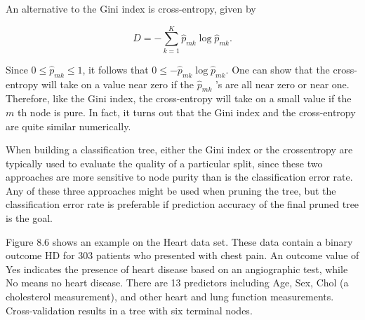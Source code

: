 \documentclass[10pt]{article}
\begin{document}
An alternative to the Gini index is cross-entropy, given by


\begin{equation*}
D=-\sum_{k=1}^{K} \hat{p}_{m k} \log \hat{p}_{m k} . \tag{8.7}
\end{equation*}


Since $0 \leq \hat{p}_{m k} \leq 1$, it follows that $0 \leq-\hat{p}_{m k} \log \hat{p}_{m k}$. One can show that the cross-entropy will take on a value near zero if the $\hat{p}_{m k}$ 's are all near zero or near one. Therefore, like the Gini index, the cross-entropy will take on a small value if the $m$ th node is pure. In fact, it turns out that the Gini index and the cross-entropy are quite similar numerically.

When building a classification tree, either the Gini index or the crossentropy are typically used to evaluate the quality of a particular split, since these two approaches are more sensitive to node purity than is the classification error rate. Any of these three approaches might be used when pruning the tree, but the classification error rate is preferable if prediction accuracy of the final pruned tree is the goal.

Figure 8.6 shows an example on the Heart data set. These data contain a binary outcome HD for 303 patients who presented with chest pain. An outcome value of Yes indicates the presence of heart disease based on an angiographic test, while No means no heart disease. There are 13 predictors including Age, Sex, Chol (a cholesterol measurement), and other heart and lung function measurements. Cross-validation results in a tree with six terminal nodes.
\end{document}
